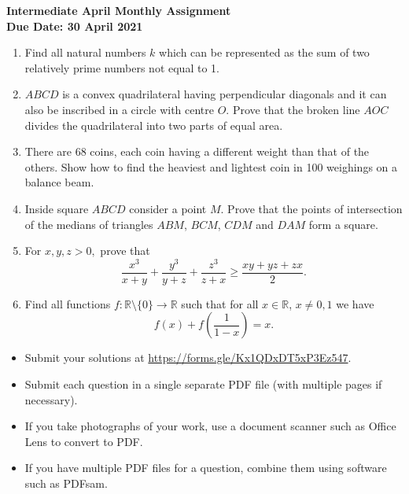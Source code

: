 \documentclass{article}
\begin{document}
\thispagestyle{empty}

\begin{center}
  \textbf{\Large Intermediate April Monthly Assignment}
  \\ \vspace{1em}
  \textbf{\large Due Date: 30 April 2021}
\end{center}

\vspace{12pt}

\begin{enumerate}[1.]

\vspace{6pt}

\item %
Find all natural numbers $k$ which can be represented as the sum of two relatively prime numbers not equal to 1.

\item %
$ABCD$ is a convex quadrilateral having perpendicular diagonals and it can also be inscribed in a circle with centre $O$. Prove that the broken line $AOC$ divides the quadrilateral into two parts of equal area. 

\item %
There are 68 coins, each coin having a different weight than that of the others. Show how to find the heaviest and lightest coin in 100 weighings on a balance beam.

\item %
Inside square $ABCD$ consider a point $M$. Prove that the points of intersection of the medians of triangles $ABM$, $BCM$, $CDM$ and $DAM$ form a square.

\item %
For $x,y,z >0,$ prove that $$\frac{x^3}{x+y}+\frac{y^3}{y+z} + \frac{z^3}{z+x} \geq \frac{xy+yz+zx}{2}.$$

\item %
Find all functions $f:\mathbb{R}\setminus\{0\}\to\mathbb{R}$ such that for all $x\in\mathbb{R}$, $x\ne 0,1$ we have
	$$f(x)+f\left(\frac{1}{1-x}\right)=x.$$

\end{enumerate}


\vfill
\begin{itemize}
	\item Submit your solutions at \url{https://forms.gle/Kx1QDxDT5xP3Ez547}.
	\item Submit each question in a single separate PDF file (with multiple pages if necessary).
	\item If you take photographs of your work, use a document scanner such as Office Lens to convert to PDF.
	\item If you have multiple PDF files for a question, combine them using software such as PDFsam.
\end{itemize}
\end{document}
